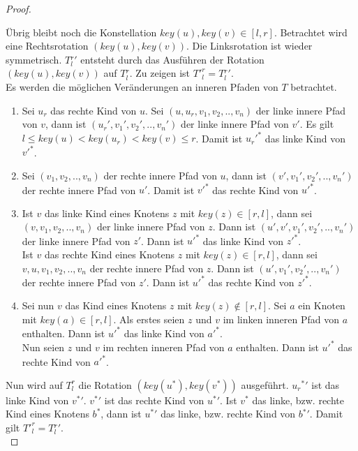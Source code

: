 \documentclass[a4paper,12pt]{article}
\begin{document}
\begin{proof}
\begin{enumerate}
	\end{enumerate}	
	\noindent Übrig bleibt noch die Konstellation $\mathit{key}\left(u\right),\mathit{key}(v) \in \left[l,r\right]$. 
	Betrachtet wird eine Rechtsrotation $\left(\mathit{key}\left(u\right),\mathit{key}\left(v\right)\right)$. Die Linksrotation ist wieder symmetrisch. 
	 $T{^r_l}'$ entsteht durch das Ausführen der Rotation  $\left(\mathit{key}\left(u\right),\mathit{key}\left(v\right)\right)$ auf $T{^r_l}$. Zu zeigen ist ${T'}^r_l = T{^r_l}' $.\\
	Es werden die möglichen Veränderungen an inneren Pfaden von $T$ betrachtet.
	\begin{enumerate}
		\item Sei $u_r$ das rechte Kind von $u$. Sei $\left(u,u_r,v_1, v_2,..,v_n\right)$ der linke innere Pfad von $v$, dann ist $\left({u_r}',{v_1}',{v_2}',..,{v_n}'\right)$ der linke innere Pfad von $v'$. Es gilt ${l \leq \mathit{key}\left(u\right) < \mathit{key}\left(u_r\right) < \mathit{key}\left(v\right) \leq r}$. Damit ist ${{u_r}'}^*$ das linke Kind von ${v'}^*$.
		\item Sei $\left(v_1, v_2,..,v_n\right)$ der rechte innere Pfad von $u$, dann ist $\left(v',{v_1}', {v_2}',..,{v_n}'\right)$ der rechte innere Pfad von $u'$. Damit ist ${v'}^*$ das rechte Kind von ${u'}^*$.
		\item Ist $v$ das linke Kind eines Knotens $z$ mit $\mathit{key}(z) \in \left[r,l\right]$, dann sei  $\left(v,v_1, v_2,..,v_n\right)$ der linke innere Pfad von $z$. Dann ist  $\left(u',v',{v_1}', {v_2}',..,{v_n}'\right)$ der linke innere Pfad von $z'$. Dann ist ${u'}^*$ das linke Kind von ${z'}^*$.\\
		Ist $v$ das rechte Kind eines Knotens $z$ mit $\mathit{key}(z) \in \left[r,l\right]$, dann sei  $v,u, v_1, v_2,..,v_n$ der rechte innere Pfad von $z$. Dann ist  $\left(u',{v_1}', {v_2}',..,{v_n}'\right)$ der rechte innere Pfad von $z'$. Dann ist ${u'}^*$ das rechte Kind von ${z'}^*$.
		\item  Sei nun $v$ das Kind eines Knotens $z$ mit $\mathit{key}(z) \notin \left[r,l\right]$. Sei $a$ ein Knoten mit $\mathit{key}(a) \in \left[r,l\right]$. 
		Als erstes seien $z$ und $v$ im linken inneren Pfad von $a$ enthalten. Dann ist ${{u}'}^*$ das linke Kind von ${a'}^*$.\\
		Nun seien $z$ und $v$ im rechten inneren Pfad von $a$ enthalten. Dann ist ${{u}'}^*$ das rechte Kind von ${a'}^*$.\\
	\end{enumerate}
	\noindent Nun wird auf ${T}^r_l$ die Rotation $ \left(\mathit{key}\left(u^*\right),\mathit{key}\left(v^*\right)\right)$ ausgeführt. ${{u_r}^*}'$ ist das linke Kind von $v{^*}'$. $v{^*}'$ ist das rechte Kind von $u{^*}'$. Ist $v^*$ das linke, bzw. rechte Kind eines Knotens $b^*$, dann ist $u{^*}'$ das linke, bzw. rechte Kind von $b{^*}'$.
	 Damit gilt ${T'}^r_l = T{^r_l}'$.\\
	
\end{proof}
\end{document}
